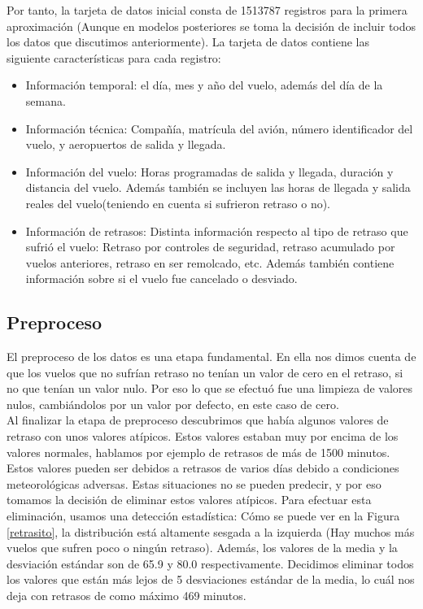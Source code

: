 \documentclass[format=acmsmall, review=false, screen=true]{acmart}
\begin{document}
Por tanto, la tarjeta de datos inicial consta de 1513787 registros para la primera aproximación (Aunque en modelos posteriores se toma la decisión de incluir todos los datos que discutimos anteriormente). La tarjeta de datos contiene las siguiente características para cada registro:
\begin{itemize}
\item Información temporal: el día, mes y año del vuelo, además del día de la semana.
\item Información técnica: Compañía, matrícula del avión, número identificador del vuelo, y aeropuertos de salida y llegada.
\item Información del vuelo: Horas programadas de salida y llegada, duración y distancia del vuelo. Además también se incluyen las horas de llegada y salida reales del vuelo(teniendo en cuenta si sufrieron retraso o no).
\item Información de retrasos: Distinta información respecto al tipo de retraso que sufrió el vuelo: Retraso por controles de seguridad, retraso acumulado por vuelos anteriores, retraso en ser remolcado, etc. Además también contiene información sobre si el vuelo fue cancelado o desviado.
\end{itemize}

\subsection{Preproceso}
El preproceso de los datos es una etapa fundamental. En ella nos dimos cuenta de que los vuelos que no sufrían retraso no tenían un valor de cero en el retraso, si no que tenían un valor nulo. Por eso lo que se efectuó fue una limpieza de valores nulos, cambiándolos por un valor por defecto, en este caso de cero. \\

Al finalizar la etapa de preproceso descubrimos que había algunos valores de retraso con unos valores atípicos. Estos valores estaban muy por encima de los valores normales, hablamos por ejemplo de retrasos de más de 1500 minutos. Estos valores pueden ser debidos a retrasos de varios días debido a condiciones meteorológicas adversas. Estas situaciones no se pueden predecir, y por eso tomamos la decisión de eliminar estos valores atípicos. Para efectuar esta eliminación, usamos una detección estadística:
Cómo se puede ver en la Figura \ref{retrasito}, la distribución está altamente sesgada a la izquierda (Hay muchos más vuelos que sufren poco o ningún retraso). Además, los valores de la media y la desviación estándar son de 65.9 y 80.0 respectivamente. Decidimos eliminar todos los valores que están más lejos de 5 desviaciones estándar de la media, lo cuál nos deja con retrasos de como máximo 469 minutos. 
\end{document}

